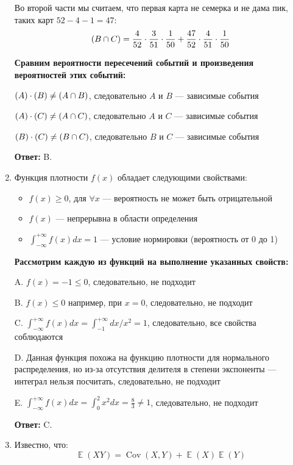 \documentclass[a4paper]{article} %
\DeclareMathOperator{\Cov}{Cov}
\DeclareMathOperator{\E}{\mathbb{E}}
\let\P\relax
\DeclareMathOperator{\P}{\mathbb{P}}
\renewcommand{\le}{\leqslant}
\renewcommand{\ge}{\geqslant}
\begin{document}
\begin{enumerate}
    Во второй части мы считаем, что первая карта не семерка и не дама пик, таких карт $52-4-1=47$:
    \[
    \P(B \cap C) = \frac{4}{52}\cdot\frac{3}{51}\cdot\frac{1}{50} + \frac{47}{52}\cdot\frac{4}{51}\cdot\frac{1}{50}
    \] 
    
    \textbf{Сравним вероятности пересечений событий и произведения вероятностей этих событий:}
    
    $ \P(A) \cdot \P(B) \neq \P(A \cap B) $, следовательно $A$ и $B$ — зависимые события
    
    $ \P(A) \cdot \P(C) \neq \P(A \cap C) $, следовательно $A$ и $C$ — зависимые события
    
    $ \P(B) \cdot \P(C) \neq \P(B \cap C) $, следовательно $B$ и $C$ — зависимые события
    
    \textbf{Ответ:} B.
    
    
    \item
    Функция плотности $f(x)$ обладает следующими свойствами:
    \begin{itemize}
        \item $f(x) \ge 0$, для $ \forall x$ — вероятность не может быть отрицательной
        \item $f(x)$ — непрерывна в области определения
        \item $ \int_{-\infty}^{+\infty} f(x) dx = 1$ — условие нормировки (вероятность от 0 до 1)
    \end{itemize}
    
    \textbf{Рассмотрим каждую из функций на выполнение указанных свойств:}
    
    A. $f(x) = -1 \le 0$, следовательно, не подходит
    
    B. $f(x) \le 0$ например, при $x = 0$, следовательно, не подходит
    
    C. $ \int_{-\infty}^{+\infty} f(x) dx = \int_{-1}^{+\infty} dx/x^2 = 1 $, следовательно, все свойства соблюдаются
    
    D. Данная функция похожа на функцию плотности для нормального распределения, но из-за отсутствия делителя в степени экспоненты — интеграл нельзя посчитать, следовательно, не подходит
    
    E. $ \int_{-\infty}^{+\infty} f(x) dx = \int_{0}^{2} x^2 dx = \frac{8}{3} \neq 1 $, следовательно, не подходит
    
    \textbf{Ответ:} C.
    
    
    \item
    Известно, что:
    \[
    \E(XY) = \Cov(X,Y) + \E(X)\E(Y)
    \]
    

\end{enumerate}
\end{document}
